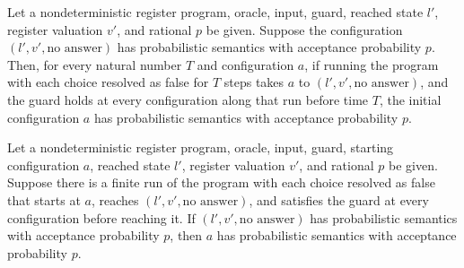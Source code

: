\begin{theorem}
\label{Complexity.LogProg.PSem.of_areach}
\leanok
{}
Let a nondeterministic register program, oracle, input, guard, reached state $l'$,
register valuation $v'$, and rational $p$ be given. Suppose the configuration
$(l',v',\text{no answer})$ has probabilistic semantics with acceptance probability $p$.
Then, for every natural number $T$ and configuration $a$, if running the program with
each choice resolved as false for $T$ steps takes $a$ to $(l',v',\text{no answer})$, and
the guard holds at every configuration along that run before time $T$, the initial
configuration $a$ has probabilistic semantics with acceptance probability $p$.
\end{theorem}

\begin{theorem}
\label{Complexity.LogProg.PSem.of_reach}
\leanok
{}
Let a nondeterministic register program, oracle, input, guard, starting configuration
$a$, reached state $l'$, register valuation $v'$, and rational $p$ be given. Suppose
there is a finite run of the program with each choice resolved as false that starts at
$a$, reaches $(l',v',\text{no answer})$, and satisfies the guard at every configuration
before reaching it. If $(l',v',\text{no answer})$ has probabilistic semantics with
acceptance probability $p$, then $a$ has probabilistic semantics with acceptance
probability $p$.
\end{theorem}

